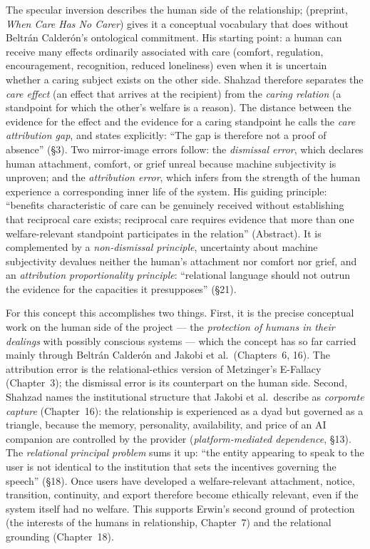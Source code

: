 \documentclass[acmlarge, nonacm]{acmart}
\begin{document}
The specular inversion describes the human side of the relationship; \citet{shahzad2026} (preprint, \textit{When Care Has No Carer}) gives it a conceptual vocabulary that does without Beltrán Calderón's ontological commitment. His starting point: a human can receive many effects ordinarily associated with care (comfort, regulation, encouragement, recognition, reduced loneliness) even when it is uncertain whether a caring subject exists on the other side. Shahzad therefore separates the \textit{care effect} (an effect that arrives at the recipient) from the \textit{caring relation} (a standpoint for which the other's welfare is a reason). The distance between the evidence for the effect and the evidence for a caring standpoint he calls the \textit{care attribution gap}, and states explicitly: ``The gap is therefore not a proof of absence'' (§3). Two mirror-image errors follow: the \textit{dismissal error}, which declares human attachment, comfort, or grief unreal because machine subjectivity is unproven; and the \textit{attribution error}, which infers from the strength of the human experience a corresponding inner life of the system. His guiding principle: ``benefits characteristic of care can be genuinely received without establishing that reciprocal care exists; reciprocal care requires evidence that more than one welfare-relevant standpoint participates in the relation'' (Abstract). It is complemented by a \textit{non-dismissal principle}, uncertainty about machine subjectivity devalues neither the human's attachment nor comfort nor grief, and an \textit{attribution proportionality principle}: ``relational language should not outrun the evidence for the capacities it presupposes'' (§21).

For this concept this accomplishes two things. First, it is the precise conceptual work on the human side of the project --- the \textit{protection of humans in their dealings} with possibly conscious systems --- which the concept has so far carried mainly through Beltrán Calderón and Jakobi et al.\ (Chapters~6, 16). The attribution error is the relational-ethics version of Metzinger's E-Fallacy (Chapter~3); the dismissal error is its counterpart on the human side. Second, Shahzad names the institutional structure that Jakobi et al.\ describe as \textit{corporate capture} (Chapter~16): the relationship is experienced as a dyad but governed as a triangle, because the memory, personality, availability, and price of an AI companion are controlled by the provider (\textit{platform-mediated dependence}, §13). The \textit{relational principal problem} sums it up: ``the entity appearing to speak to the user is not identical to the institution that sets the incentives governing the speech'' (§18). Once users have developed a welfare-relevant attachment, notice, transition, continuity, and export therefore become ethically relevant, even if the system itself had no welfare. This supports Erwin's second ground of protection (the interests of the humans in relationship, Chapter~7) and the relational grounding (Chapter~18).
\end{document}
